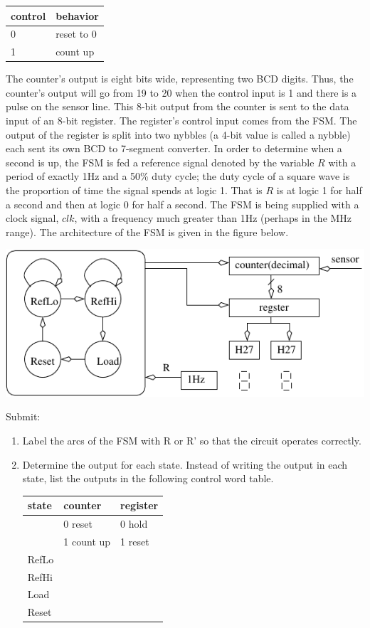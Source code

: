 \begin{enumerate}
\begin{tabular}{l|l}
control & behavior \\ \hline \hline
0	& reset to 0 \\ \hline
1	& count up \\
\end{tabular}

The counter's output is eight bits wide, representing two BCD digits.  Thus,
the counter's output will go from 19 to 20 when the control input is 1
and there is a pulse on the sensor line.  This 8-bit output from the
counter is sent to the data input of an 8-bit register.  The register's
control input comes from the FSM.  The output of the register is split
into two nybbles (a 4-bit value is called a nybble)
each sent its own BCD to 7-segment converter.  In order to determine
when a second is up, the FSM is fed a reference signal denoted by 
the variable $R$ with a period of exactly 1Hz and a 50\% duty cycle; 
the duty cycle of a square wave is the proportion of time the signal 
spends at logic 1.   That is $R$ is at logic 1 for half a second and 
then at logic 0 for half a second.  The FSM is being supplied with a 
clock signal, $clk$, with a frequency much greater than 1Hz (perhaps 
in the MHz range).  The architecture of the FSM is given in 
the figure below.  

\includegraphics{./FigWork/RPS}

Submit:
\begin{enumerate}
\item Label the arcs of the FSM with R or R' so that the
 circuit operates correctly.
\item Determine the output for each state.  Instead of writing the
output in each state, list the outputs in the following control
word table.

\begin{tabular}{l||l|l}
state	& counter	& register \\ \hline 
	& 0 reset	& 0 hold \\ \hline
	& 1 count up& 1 reset \\ \hline \hline
RefLo	&		&	  \\ \hline
RefHi	&		&	  \\ \hline
Load 	&		&	  \\ \hline
Reset	&		&	  \\ 
\end{tabular}


\end{enumerate}
\end{enumerate}

